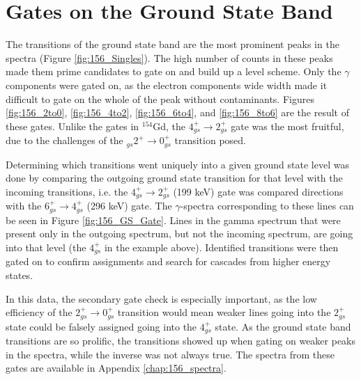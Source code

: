\section{Gates on the Ground State Band}

The transitions of the ground state band are the most prominent peaks in the spectra (Figure \ref{fig:156_Singles}). The high number of counts in these peaks made them prime candidates to gate on and build up a level scheme. Only the $\gamma$ components were gated on, as the electron components wide width made it difficult to gate on the whole of the peak without contaminants. Figures \ref{fig:156_2to0}, \ref{fig:156_4to2}, \ref{fig:156_6to4}, and \ref{fig:156_8to6} are the result of these gates. Unlike the gates in $^{154}$Gd, the $4_{gs}^+\rightarrow2_{gs}^+$ gate was the most fruitful, due to the challenges of the $_{gs}2^+\rightarrow0_{gs}^+$ transition posed. 

\afterpage{\clearpage}

\afterpage{\clearpage}

\afterpage{\clearpage}

\afterpage{\clearpage}

Determining which transitions went uniquely into a given ground state level was done by comparing the outgoing ground state transition for that level with the incoming transitions, i.e. the $4_{gs}^+\rightarrow2_{gs}^+$ (199 keV) gate was compared directions with the $6_{gs}^+\rightarrow4_{gs}^+$ (296 keV) gate. The $\gamma$-spectra corresponding to these lines can be seen in Figure \ref{fig:156_GS_Gate}. Lines in the gamma spectrum that were present only in the outgoing spectrum, but not the incoming spectrum, are going into that level (the $4_{gs}^+$ in the example above). Identified transitions were then gated on to confirm assignments and search for cascades from higher energy states.



In this data, the secondary gate check is especially important, as the low efficiency of the $2_{gs}^+\rightarrow0_{gs}^+$ transition would mean weaker lines going into the $2_{gs}^+$ state could be falsely assigned going into the $4_{gs}^+$ state. As the ground state band transitions are so prolific, the transitions showed up when gating on weaker peaks in the spectra, while the inverse was not always true. The spectra from these gates are available in Appendix \ref{chap:156_spectra}.

